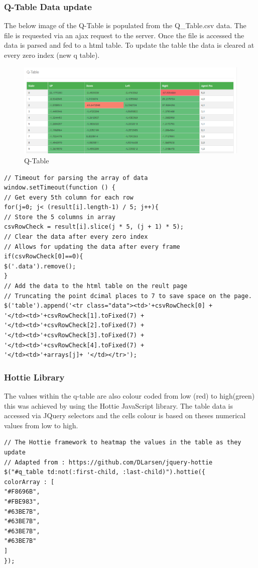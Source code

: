 \subsubsection{Q-Table Data update}
The below image of the Q-Table is populated from the Q\_Table.csv data. The file is requested via an ajax request to the server. Once the file is accessed the data is parsed and fed to a html table. 
To update the table the data is cleared at every zero index (new q table).

\begin{figure}[H]
	\centering
	\includegraphics[width=0.7\linewidth]{img/qtable}
	\caption{Q-Table}
	\label{fig:qtable}
\end{figure}
\begin{verbatim}
// Timeout for parsing the array of data
window.setTimeout(function () {
// Get every 5th column for each row
for(j=0; j< (result[i].length-1) / 5; j++){
// Store the 5 columns in array
csvRowCheck = result[i].slice(j * 5, (j + 1) * 5);
// Clear the data after every zero index
// Allows for updating the data after every frame
if(csvRowCheck[0]==0){
$('.data').remove();
}
// Add the data to the html table on the reult page
// Truncating the point dcimal places to 7 to save space on the page.
$('table').append('<tr class="data"><td>'+csvRowCheck[0] + 
'</td><td>'+csvRowCheck[1].toFixed(7) + 
'</td><td>'+csvRowCheck[2].toFixed(7) + 
'</td><td>'+csvRowCheck[3].toFixed(7) +
'</td><td>'+csvRowCheck[4].toFixed(7) + 
'</td><td>'+arrays[j]+ '</td></tr>');
\end{verbatim}
\subsubsection{Hottie Library}
The values within the q-table are also colour coded from low (red) to high(green) this was achieved by using the Hottie JavaScript library. The table data is accessed via JQuery selectors and the cells colour is based on theses numerical values from low to high.
\begin{verbatim}
// The Hottie framework to heatmap the values in the table as they update
// Adapted from : https://github.com/DLarsen/jquery-hottie
$("#q_table td:not(:first-child, :last-child)").hottie({
colorArray : [
"#F8696B",
"#FBE983",
"#63BE7B",
"#63BE7B",
"#63BE7B",
"#63BE7B"
]
});
\end{verbatim}

